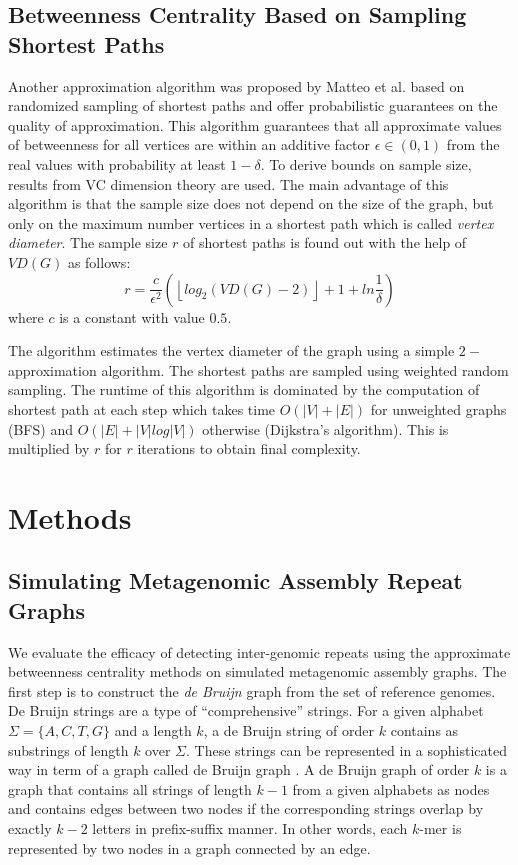 \documentclass[runningheads,a4paper]{llncs}
\begin{document}
\subsection*{Betweenness Centrality Based on Sampling Shortest Paths}
Another approximation algorithm was proposed by Matteo et al. \cite{matteo} based on randomized sampling of shortest paths and offer probabilistic guarantees on the quality of approximation. This algorithm guarantees that all approximate values of betweenness for all vertices are within an additive factor $\epsilon \in (0,1)$ from the real values with probability at least $1-\delta$. To derive bounds on sample size, results from VC dimension theory\cite{vc} are used. The main advantage of this algorithm is that the sample size does not depend on the size of the graph, but only on the maximum number vertices in a shortest path which is called \textit{vertex diameter}. The sample size $r$ of shortest paths is found out with the help of $VD(G)$ as follows:
\begin{equation} \label{sample_size_algo}
r = \frac{c}{\epsilon^{2}}(\left\lfloor{log_{2}(VD(G) - 2)}\right\rfloor + 1 + ln\frac{1}{\delta})
\end{equation} 
where $c$ is a constant with value $0.5$. 

The algorithm estimates the vertex diameter of the graph using a simple $2-$approximation algorithm. The shortest paths are sampled using weighted random sampling. The runtime of this algorithm is dominated by the computation of shortest path at each step which takes time $O(|V| + |E|)$ for unweighted graphs (BFS) and $O(|E| + |V|log|V|)$ otherwise (Dijkstra's algorithm). This is multiplied by $r$ for $r$ iterations to obtain final complexity.


\section{Methods}


\subsection*{Simulating Metagenomic Assembly Repeat Graphs}

We evaluate the efficacy of detecting inter-genomic repeats using the approximate betweenness centrality methods on simulated metagenomic assembly graphs.
The first step is to construct the \textit{de Bruijn} graph from the set of reference genomes.
De Bruijn strings are a type of ``comprehensive'' strings. For a given alphabet $\Sigma = \{A,C,T,G\}$ and a length $k$, a de Bruijn string of order $k$ contains as substrings of length $k$ over $\Sigma$. These strings can be represented in a sophisticated way in term of a graph called de Bruijn graph \cite{debruijn}. A de Bruijn graph of order $k$ is a graph that contains all strings of length $k-1$ from a given alphabets as nodes and contains edges between two nodes if the corresponding strings overlap by exactly $k-2$ letters in prefix-suffix manner. In other words, each $k$-mer is represented by two nodes in a graph connected by an edge. 
\end{document}
